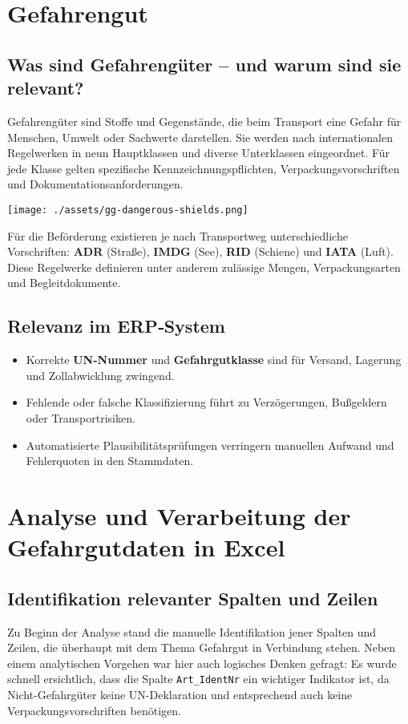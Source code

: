 \section{Gefahrengut}
\subsection{Was sind Gefahrengüter – und warum sind sie relevant?}

Gefahrengüter sind Stoffe und Gegenstände, die beim Transport eine
Gefahr für Menschen, Umwelt oder Sachwerte darstellen. Sie werden nach
internationalen Regelwerken in neun Hauptklassen und diverse Unterklassen
eingeordnet. Für jede Klasse gelten spezifische Kennzeichnungspflichten,
Verpackungsvorschriften und Dokumentationsanforderungen.

\begin{center}
  \texttt{[image: ./assets/gg-dangerous-shields.png]}
\end{center}

Für die Beförderung existieren je nach Transportweg unterschiedliche Vorschriften:
\textbf{ADR} (Straße), \textbf{IMDG} (See), \textbf{RID} (Schiene) und \textbf{IATA} (Luft).
Diese Regelwerke definieren unter anderem zulässige Mengen, Verpackungsarten und
Begleitdokumente.

\subsection{Relevanz im ERP‐System}
\begin{itemize}
  \item Korrekte \textbf{UN-Nummer} und \textbf{Gefahrgutklasse} sind für
        Versand, Lagerung und Zollabwicklung zwingend.
  \item Fehlende oder falsche Klassifizierung führt zu
        Verzögerungen, Bußgeldern oder Transportrisiken.
  \item Automatisierte Plausibilitätsprüfungen verringern manuellen
        Aufwand und Fehlerquoten in den Stammdaten.
\end{itemize}


\section{Analyse und Verarbeitung der Gefahrgutdaten in Excel}

\subsection{Identifikation relevanter Spalten und Zeilen}
Zu Beginn der Analyse stand die manuelle Identifikation jener Spalten und Zeilen, die überhaupt mit dem 
Thema Gefahrgut in Verbindung stehen. Neben einem analytischen Vorgehen war hier auch logisches Denken gefragt: 
Es wurde schnell ersichtlich, dass die Spalte \texttt{Art\_IdentNr} ein wichtiger Indikator ist, 
da Nicht-Gefahrgüter keine UN-Deklaration und entsprechend auch keine Verpackungsvorschriften benötigen.

